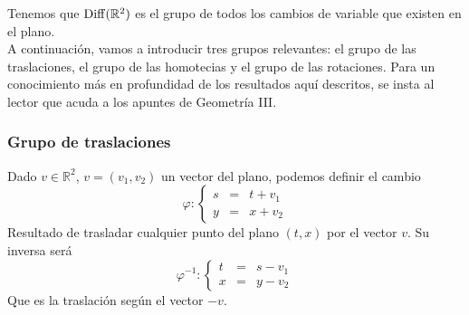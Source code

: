 Tenemos que $\operatorname{Diff}(\mathbb{R}^2)$ es el grupo de todos los cambios de variable que existen en el plano.\\

A continuación, vamos a introducir tres grupos relevantes: el grupo de las traslaciones, el grupo de las homotecias y el grupo de las rotaciones. Para un conocimiento más en profundidad de los resultados aquí descritos, se insta al lector que acuda a los apuntes de Geometría III.


\subsubsection{Grupo de traslaciones}
Dado $v\in \mathbb{R}^2$, $v=(v_1,v_2)$ un vector del plano, podemos definir el cambio
\begin{equation*}
    \varphi: \left\{\begin{array}{rcl}
            s &= &t + v_1 \\
            y &= &x + v_2
    \end{array}\right.
\end{equation*}
Resultado de trasladar cualquier punto del plano $(t,x)$ por el vector $v$. Su inversa será
\begin{equation*}
    \varphi^{-1}: \left\{\begin{array}{rcl}
            t &= &s - v_1 \\
            x &= &y - v_2
    \end{array}\right.
\end{equation*}
Que es la traslación según el vector $-v$.


